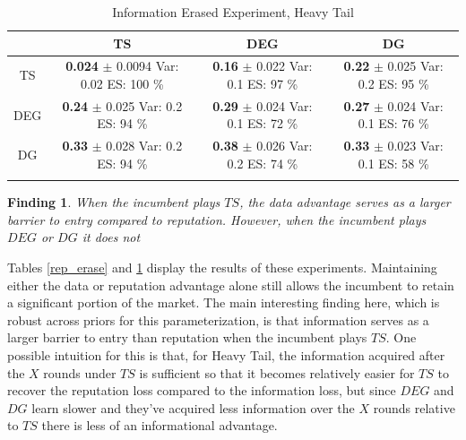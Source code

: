 \documentclass{article}
\theoremstyle{definition}
\newtheorem{finding}{Finding}
\begin{document}
\begin{table}[ht]
\centering
\caption{Information Erased Experiment, Heavy Tail} 
\begin{tabular}{c@{\hspace{1.0\tabcolsep}}ccc}
  \hline
 & TS & DEG &  DG \\ 
  \hline
TS & \makecell{\textbf{ 0.024 } $\pm$ 0.0094 \\Var: 0.02 \\ ES: 100 \%} & \makecell{\textbf{ 0.16 } $\pm$ 0.022 \\Var: 0.1 \\ ES: 97 \%} & \makecell{\textbf{ 0.22 } $\pm$ 0.025 \\Var: 0.2 \\ ES: 95 \%} \\ 
  DEG & \makecell{\textbf{ 0.24 } $\pm$ 0.025 \\Var: 0.2 \\ ES: 94 \%} & \makecell{\textbf{ 0.29 } $\pm$ 0.024 \\Var: 0.1 \\ ES: 72 \%} & \makecell{\textbf{ 0.27 } $\pm$ 0.024 \\Var: 0.1 \\ ES: 76 \%} \\ 
   DG & \makecell{\textbf{ 0.33 } $\pm$ 0.028 \\Var: 0.2 \\ ES: 94 \%} & \makecell{\textbf{ 0.38 } $\pm$ 0.026 \\Var: 0.2 \\ ES: 74 \%} & \makecell{\textbf{ 0.33 } $\pm$ 0.023 \\Var: 0.1 \\ ES: 58 \%} \\ 
   \hline
   \label{info_erase}
\end{tabular}
\end{table}

\begin{finding}
\textit{When the incumbent plays $TS$, the data advantage serves as a larger barrier to entry compared to reputation. However, when the incumbent plays $DEG$ or $DG$ it does not} 
\end{finding}

Tables \ref{rep_erase} and \ref{info_erase} display the results of these experiments. Maintaining either the data or reputation advantage alone still allows the incumbent to retain a significant portion of the market. The main interesting finding here, which is robust across priors for this parameterization, is that information serves as a larger barrier to entry than reputation when the incumbent plays $TS$. One possible intuition for this is that, for Heavy Tail, the information acquired after the $X$ rounds under $TS$ is sufficient so that it becomes relatively easier for $TS$ to recover the reputation loss compared to the information loss, but since $DEG$ and $DG$ learn slower and they've acquired less information over the $X$ rounds relative to $TS$ there is less of an informational advantage.
\end{document}
